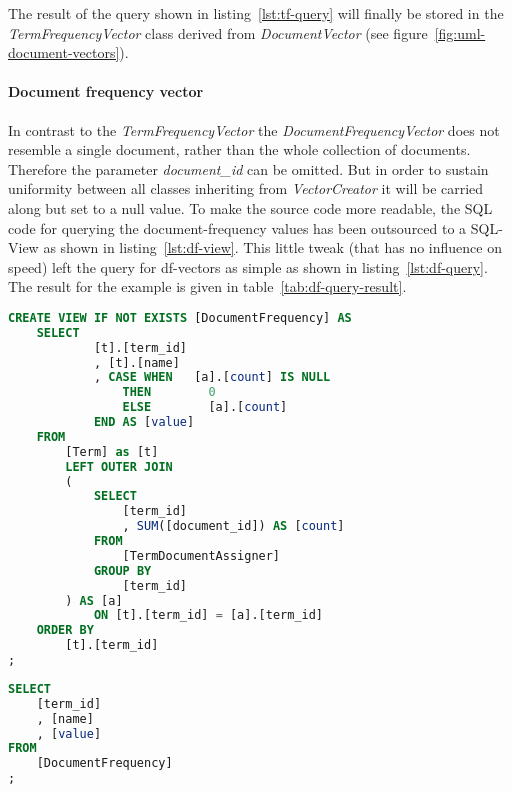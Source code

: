 \noindent
The result of the query shown in listing~\ref{lst:tf-query} will finally be stored in the \textit{TermFrequencyVector} class derived from \textit{DocumentVector} (see figure~\ref{fig:uml-document-vectors}).

\paragraph{Document frequency vector}
In contrast to the \textit{TermFrequencyVector} the \textit{DocumentFrequencyVector} does not resemble a single document, rather than the whole collection of documents.
Therefore the parameter \textit{document\_id} can be omitted.
But in order to sustain uniformity between all classes inheriting from \textit{VectorCreator} it will be carried along but set to a null value.
To make the source code more readable, the SQL code for querying the document-frequency values has been outsourced to a SQL-View as shown in listing~\ref{lst:df-view}.
This little tweak (that has no influence on speed) left the query for df-vectors as simple as shown in listing~\ref{lst:df-query}.
The result for the example is given in table~\ref{tab:df-query-result}.

\begin{lstlisting}[language=SQL,caption={SQL statement to create the \textit{DocumentFrequency}-view},label={lst:df-view},float=h]
CREATE VIEW IF NOT EXISTS [DocumentFrequency] AS
    SELECT
            [t].[term_id]
            , [t].[name]
            , CASE WHEN   [a].[count] IS NULL
                THEN        0
                ELSE        [a].[count]
            END AS [value]
    FROM
        [Term] as [t]
        LEFT OUTER JOIN
        (
            SELECT
                [term_id]
                , SUM([document_id]) AS [count]
            FROM
                [TermDocumentAssigner]
            GROUP BY
                [term_id]
        ) AS [a]
            ON [t].[term_id] = [a].[term_id]
    ORDER BY
        [t].[term_id]
;
\end{lstlisting}

\begin{lstlisting}[language=SQL,caption={SQL query for generating df-vectors},label={lst:df-query},float=h]
SELECT
    [term_id]
    , [name]
    , [value]
FROM
    [DocumentFrequency]
;
\end{lstlisting}

